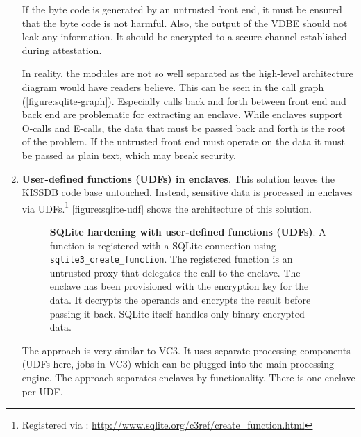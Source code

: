 \begin{enumerate}
If the byte code is generated by an untrusted front end, it must be ensured that the byte code is not harmful. Also, the output of the VDBE should not leak any information. It should be encrypted to a secure channel established during attestation.\label{ID_902916871}

In reality, the modules are not so well separated as the high-level architecture diagram would have readers believe.\label{ID_109832281}
This can be seen in the call graph (\autoref{figure:sqlite-graph}).\label{ID_1572157209}
Especially calls back and forth between front end and back end are problematic for extracting an enclave.\label{ID_75232381}
While enclaves support O-calls and E-calls, the data that must be passed back and forth is the root of the problem.\label{ID_319109209}
If the untrusted front end must operate on the data it must be passed as plain text, which may break security.\label{ID_1285211358}
\item \textbf{User-defined functions (UDFs) in enclaves}.\label{ID_1233009872}
This solution leaves the KISSDB code base untouched.\label{ID_1587466546}
Instead, sensitive data is processed in enclaves via UDFs.\footnote{Registered via : \url{http://www.sqlite.org/c3ref/create_function.html}}\label{ID_321698949}
\autoref{figure:sqlite-udf} shows the architecture of this solution.\label{ID_1839630476}
\begin{figure}[htbp]
\makebox[\textwidth][c]{
}\caption{\textbf{SQLite hardening with user-defined functions (UDFs)}.\label{ID_1588471613}
A function is registered with a SQLite connection using \texttt{sqlite3\_{}create\_{}function}.\label{ID_1863091039}
The registered function is an untrusted proxy that delegates the call to the enclave.\label{ID_35187670}
The enclave has been provisioned with the encryption key for the data.\label{ID_1543100}
It decrypts the operands and encrypts the result before passing it back.\label{ID_1099637874}
SQLite itself handles only binary encrypted data.\label{ID_326009507}
\label{ID_1287020368}\label{figure:sqlite-udf}}
\end{figure}


The approach is very similar to VC3.\cite[]{Schuster2015}\label{ID_1880634869}
It uses separate processing components (UDFs here, jobs in VC3) which can be plugged into the main processing engine.\label{ID_972553018}
The approach separates enclaves by functionality.\label{ID_653270748}
There is one enclave per UDF.\label{ID_1920750707}


\end{enumerate}
